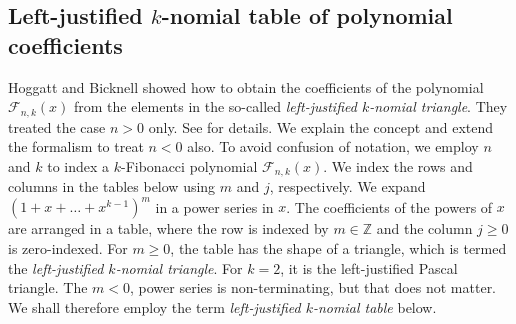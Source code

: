 \documentclass[review]{elsarticle}
\theoremstyle{plain}
\begin{document}
\subsection{Left-justified $k$-nomial table of polynomial coefficients}\label{sec:table_poly_coeff}
Hoggatt and Bicknell \cite{HoggattBicknell_FibGen} showed how to obtain the
coefficients of the polynomial $\mathcal{F}_{n,k}(x)$
from the elements in the so-called \textit{left-justified $k$-nomial triangle}.
They treated the case $n>0$ only.
See \cite{HoggattBicknell_FibGen} for details.
We explain the concept and extend the formalism to treat $n<0$ also.
To avoid confusion of notation, we employ $n$ and $k$ to index a $k$-Fibonacci polynomial $\mathcal{F}_{n,k}(x)$.
We index the rows and columns in the tables below using $m$ and $j$, respectively.
We expand $(1+x+\dots+x^{k-1})^m$ in a power series in $x$.
The coefficients of the powers of $x$ are arranged in a table, where the row is indexed by $m\in\mathbb{Z}$ and the column $j\ge0$ is zero-indexed.
For $m\ge0$, the table has the shape of a triangle,
which is termed the \textit{left-justified $k$-nomial triangle}.
For $k=2$, it is the left-justified Pascal triangle.
The $m<0$, power series is non-terminating, but that does not matter.
We shall therefore employ the term \textit{left-justified $k$-nomial table} below.
\end{document}
